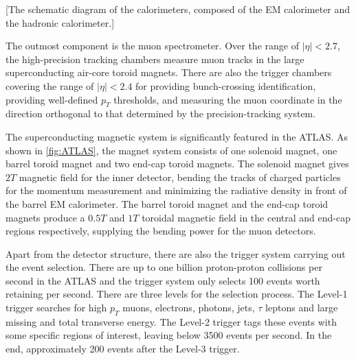 \documentclass[class=NTHU_thesis, crop=false]{standalone}
\begin{document}
[The schematic diagram of the calorimeters, composed of the EM calorimeter and the hadronic calorimeter.]

The outmost component is the muon spectrometer. Over the range of $\left|\eta\right| < 2.7$, the high-precision tracking chambers measure muon tracks in the large superconducting air-core toroid magnets. There are also the trigger chambers covering the range of $\left|\eta\right| < 2.4$ for providing bunch-crossing identification, providing well-defined $p_T$ thresholds, and measuring the muon coordinate in the direction orthogonal to that determined by the precision-tracking system.

The superconducting magnetic system\cite{Magnet_System} is significantly featured in the ATLAS. As shown in \cref{fig:ATLAS}, the magnet system consists of one solenoid magnet, one barrel toroid magnet and two end-cap toroid magnets. The solenoid magnet gives $2 T$ magnetic field for the inner detector, bending the tracks of charged particles for the momentum measurement and minimizing the radiative density in front of the barrel EM calorimeter. The barrel toroid magnet and the end-cap toroid magnets produce a $0.5 T$ and $1 T$ toroidal magnetic field in the central and end-cap regions respectively, supplying the bending power for the muon detectors.

Apart from the detector structure, there are also the trigger system\cite{Trigger_System} carrying out the event selection. There are up to one billion proton-proton collisions per second in the ATLAS and the trigger system only selects 100 events worth retaining per second. There are three levels for the selection process. The Level-1 trigger searches for high $p_T$ muons, electrons, photons, jets, $\tau$ leptons and large missing and total transverse energy. The Level-2 trigger tags these events with some specific regions of interest, leaving below 3500 events per second. In the end, approximately 200 events after the Level-3 trigger.
\end{document}
